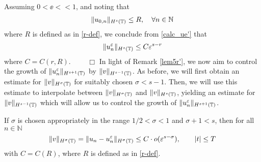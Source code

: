 Assuming $0 < \ee <<1$, and noting that
\begin{equation*}
	\begin{split}
		\|u_{0,n}\|_{H^s(\mathbb{T})} \le R, \quad \forall n \in \mathbb{N}
	\end{split}
\end{equation*}
where $R$ is defined as in \eqref{r-def},
we conclude from \eqref{calc_ue'} that 
\begin{equation*}
	\begin{split}
		\|u^\varepsilon_n\|_{H^s(\mathbb{T})} \le C \varepsilon^{s-r}
	\end{split}
\end{equation*}
where $C = C(r, R)$. $\qquad \Box$
%
In light of Remark \ref{lem5r'}, we now aim to control the growth of
$\|u^\varepsilon_n\|_{H^{s+1}(\mathbb{T})}$ by $\|v\|_{H^{s-1}(\mathbb{T})}$. As before, we will
first obtain an estimate for $\|v\|_{H^\sigma(\mathbb{T})}$ for suitably chosen
$\sigma < s-1$. Then, we will use this estimate to interpolate between
$\|v\|_{H^\sigma(\mathbb{T})}$ and $\|v\|_{H^s(\mathbb{T})}$, yielding an estimate for
$\|v\|_{H^{s-1}(\mathbb{T})}$ which will allow us to control the growth of
$\|u^\varepsilon_n\|_{H^{s+1}(\mathbb{T})}$. 
%
%
%
%
\begin{proposition}
	\label{prop:180}
If $\sigma$ is chosen appropriately in the range $1/2 < \sigma < 1$ and
$\sigma + 1 < s$, then for all $n \in \mathbb{N}$ 
	\begin{equation}
	\label{alem6rq}
	\begin{split}
		\|v\|_{H^{\sigma}(\mathbb{T})} = 
		\|u_n - u^\varepsilon_n\|_{H^\sigma(\mathbb{T})}
		\le C \cdot o(\varepsilon^{s- \sigma }), \qquad |t| \le T
	\end{split}
\end{equation}
with $C = C(R)$, where $R$ is defined as in \eqref{r-def}.
\end{proposition}
%
%
%
